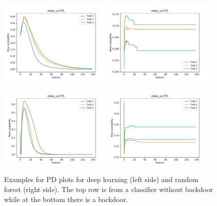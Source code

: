 \documentclass[sigconf,nonacm]{acmart}
\begin{document}
\begin{figure}[p]

\includegraphics[width=0.48\textwidth]{plots/pdp/apply(stdev(ipTTL),forward)_nn.pdf}
\includegraphics[width=0.48\textwidth]{plots/pdp/apply(stdev(ipTTL),forward)_rf.pdf}

\includegraphics[width=0.48\textwidth]{plots/pdp/apply(stdev(ipTTL),forward)_nn_bd.pdf}
\includegraphics[width=0.48\textwidth]{plots/pdp/apply(stdev(ipTTL),forward)_rf_bd.pdf}


\caption{Examples for PD plots for deep learning (left side) and random forest (right side). The top row is from a classifier without backdoor while at the bottom there is a backdoor.}
\label{fig:pdp_backdoor}
\end{figure}
\end{document}

